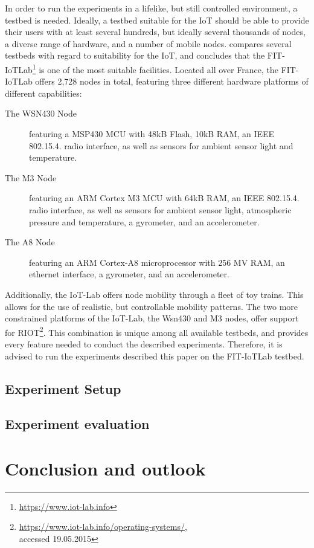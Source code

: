 \documentclass{acm_proc_article-sp}
\begin{document}
In order to run the experiments in a lifelike, but still controlled environment, a testbed is needed. Ideally, a testbed suitable for the IoT should be able to provide their users with at least several hundreds, but ideally several thousands of nodes, a diverse range of hardware, and a number of mobile nodes. \cite{testbed-survey} compares several testbeds with regard to suitability for the IoT, and concludes that the FIT-IoTLab\footnote{\url{https://www.iot-lab.info}} is one of the most suitable facilities. Located all over France, the FIT-IoTLab offers 2,728 nodes in total, featuring three different hardware platforms of different capabilities:
\begin{description}
\item[The WSN430 Node] featuring a MSP430 MCU with 48kB Flash, 10kB RAM, an IEEE 802.15.4. radio interface, as well as sensors for ambient sensor light and temperature.
\item[The M3 Node] featuring an ARM Cortex M3 MCU with 64kB RAM, an IEEE 802.15.4. radio interface, as well as sensors for ambient sensor light, atmospheric pressure and temperature, a gyrometer, and an accelerometer.
\item[The A8 Node] featuring an ARM Cortex-A8 microprocessor with 256 MV RAM, an ethernet interface, a gyrometer, and an accelerometer.
\end{description}
Additionally, the IoT-Lab offers node mobility through a fleet of toy trains. This allows for the use of realistic, but controllable mobility patterns.
The two more constrained platforms of the IoT-Lab, the Wsn430 and M3 nodes, offer support for RIOT\footnote{\url{https://www.iot-lab.info/operating-systems/}, \\accessed 19.05.2015}.
This combination is unique among all available testbeds, and provides every feature needed to conduct the described experiments. Therefore, it is advised to run the experiments described this paper on the FIT-IoTLab testbed.

\subsection{Experiment Setup}
\label{subsec:setup}

\subsection{Experiment evaluation}
\label{subsec:evaluation}

\section{Conclusion and outlook}
\label{sec:Conclusion}



\end{document}
